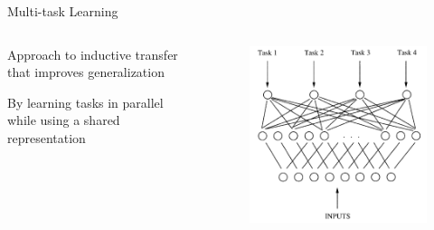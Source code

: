 \documentclass[12pt,aspectratio=169,handout]{beamer}
\begin{document}
\begin{frame}{Multi-task Learning}
	
	\begin{columns}
		\begin{column}{0.5\linewidth}
			Approach to inductive transfer that improves generalization
			
			\bigskip	
			
			By learning tasks in parallel while using a shared representation
			
		\end{column}
		\begin{column}{0.5\linewidth}
			\begin{figure}
				\includegraphics[width=\linewidth]{img/multitask.png}	
			\end{figure}
			
		\end{column}
	\end{columns}
	
	\bigskip
	
	\begin{footnotesize}
	\end{footnotesize}
	
	
\end{frame}
\end{document}
